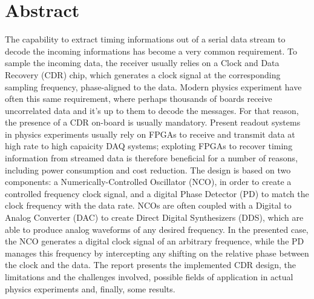 \documentclass[12pt]{extarticle}
\newcommand{\<}{\langle}
\renewcommand{\>}{\rangle}
\theoremstyle{definition}
\begin{document}
\section*{Abstract}
The capability to extract timing informations out of a serial data stream to
decode the incoming informations has become a very common requirement. To sample
the incoming data, the receiver usually relies on a Clock and Data Recovery
(CDR) chip, which generates a clock signal at the corresponding sampling
frequency, phase-aligned to the data. Modern physics experiment have often this
same requirement, where perhaps thousands of boards receive uncorrelated data
and it's up to them to decode the messages. For that reason, the presence of a
CDR on-board is usually mandatory. Present readout systems in physics
experiments usually rely on FPGAs to receive and transmit data at high rate to
high capaicity DAQ systems; exploting FPGAs to recover timing information from
streamed data is therefore beneficial for a number of reasons, including power
consumption and cost reduction. The design is based on two components: a
Numerically-Controlled Oscillator (NCO), in order to create a controlled
frequency clock signal, and a digital Phase Detector (PD) to match the clock
frequency with the data rate. NCOs are often coupled with a Digital to Analog
Converter (DAC) to create Direct Digital Synthesizers (DDS), which are able to
produce analog waveforms of any desired frequency. In the presented case, the
NCO generates a digital clock signal of an arbitrary frequence, while the PD
manages this frequency by intercepting any shifting on the relative phase
between the clock and the data. The report presents the implemented CDR design,
the limitations and the challenges involved, possible fields of application in
actual physics experiments and, finally, some results.
\end{document}

